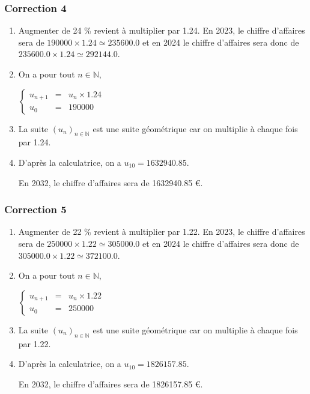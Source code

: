 \documentclass[15pt, mathserif]{beamer}
\newcommand{\N}{\mathbb{N}}			%
\newcommand{\st}[1]{$(#1_n)_{n \in \N}$}
\begin{document}
\begin{frame}
\vspace{-10mm}
	\frametitle{Correction 4}
\begin{enumerate} 
 	 \item Augmenter de 24 \% revient à multiplier par  1.24. En 2023, le chiffre d'affaires sera de $190000 \times  1.24\simeq 235600.0$ et en 2024 le chiffre d'affaires sera donc de  $235600.0 \times  1.24\simeq 292144.0$.  
 	 \item On a pour tout $n \in \N$, 
 
 \hfil$\left\{\begin{array}{rcl} 
 u_{n+1} & = & u_n \times  1.24\\ u_0 & = &  190000\end{array} \right.$ 
 	 \item La suite \st{u} est une suite géométrique car on multiplie à chaque fois par  1.24. 
 	 \item D'après la calculatrice, on a $u_{10}=1632940.85$. 
 
 En 2032, le chiffre d'affaires sera de 1632940.85 \euro. 
 \end{enumerate} 
 
 \end{frame}


\begin{frame}
\vspace{-10mm}
	\frametitle{Correction 5}
\begin{enumerate} 
 	 \item Augmenter de 22 \% revient à multiplier par  1.22. En 2023, le chiffre d'affaires sera de $250000 \times  1.22\simeq 305000.0$ et en 2024 le chiffre d'affaires sera donc de  $305000.0 \times  1.22\simeq 372100.0$.  
 	 \item On a pour tout $n \in \N$, 
 
 \hfil$\left\{\begin{array}{rcl} 
 u_{n+1} & = & u_n \times  1.22\\ u_0 & = &  250000\end{array} \right.$ 
 	 \item La suite \st{u} est une suite géométrique car on multiplie à chaque fois par  1.22. 
 	 \item D'après la calculatrice, on a $u_{10}=1826157.85$. 
 
 En 2032, le chiffre d'affaires sera de 1826157.85 \euro. 
 \end{enumerate} 
 
 \end{frame}
\end{document}
